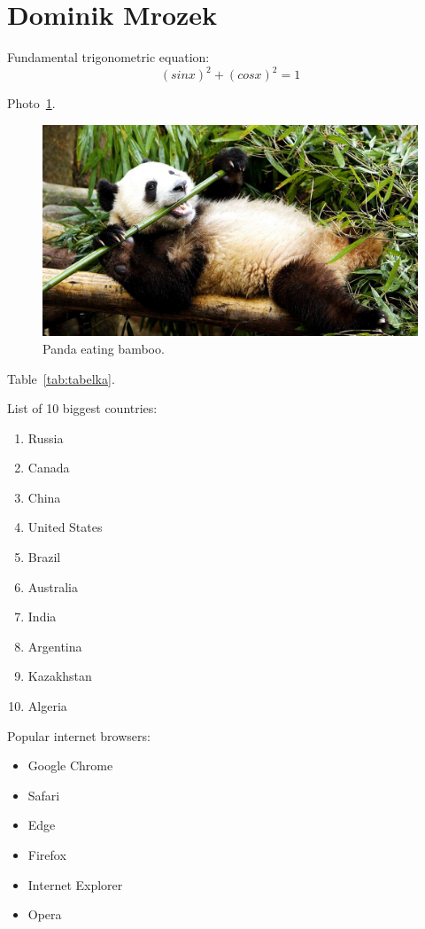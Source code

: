 \newpage
\section{Dominik Mrozek}

Fundamental trigonometric equation:
\[(sinx)^2+(cosx)^2=1\]

Photo~\ref{fig:panda}.
\begin{figure}[htbp]
    \centering
    \includegraphics[width=1\textwidth]{Pictures/panda.jpg}
    \caption{Panda eating bamboo.}
    \label{fig:panda}
\end{figure}

Table~\ref{tab:tabelka}.


\newpage
List of 10 biggest countries:
\begin{enumerate}
  \item Russia 
  \item Canada 
  \item China 	
  \item United States 
  \item Brazil
  \item Australia 
  \item India
  \item Argentina 
  \item Kazakhstan
  \item Algeria
\end{enumerate}

Popular internet browsers:
\begin{itemize}
  \item Google Chrome
  \item Safari
  \item Edge
  \item Firefox
  \item Internet Explorer
  \item Opera
\end{itemize}

